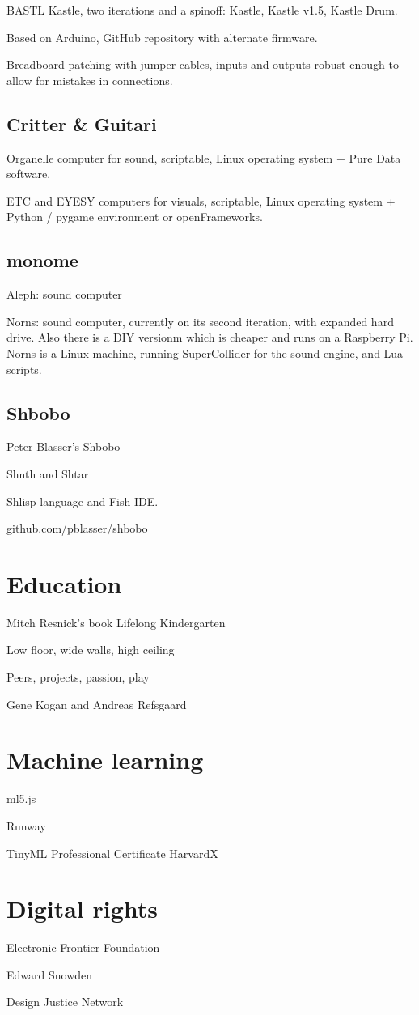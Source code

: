 BASTL Kastle, two iterations and a spinoff: Kastle, Kastle v1.5, Kastle Drum. 

Based on Arduino, GitHub repository with alternate firmware.

Breadboard patching with jumper cables, inputs and outputs robust enough to allow for mistakes in connections.

\subsection{Critter \& Guitari}

Organelle computer for sound, scriptable, Linux operating system + Pure Data software.

ETC and EYESY computers for visuals, scriptable, Linux operating system + Python / pygame environment or openFrameworks.

\subsection{monome}

Aleph: sound computer

Norns: sound computer, currently on its second iteration, with expanded hard drive. Also there is a DIY versionm which is cheaper and runs on a Raspberry Pi.
Norns is a Linux machine, running SuperCollider for the sound engine, and Lua scripts.

\subsection{Shbobo}

Peter Blasser's Shbobo

Shnth and Shtar

Shlisp language and Fish IDE.

github.com/pblasser/shbobo

\section{Education}

Mitch Resnick's book Lifelong Kindergarten

Low floor, wide walls, high ceiling

Peers, projects, passion, play

Gene Kogan and Andreas Refsgaard

\section{Machine learning}

ml5.js

Runway

TinyML Professional Certificate HarvardX

\section{Digital rights}

Electronic Frontier Foundation

Edward Snowden

Design Justice Network
